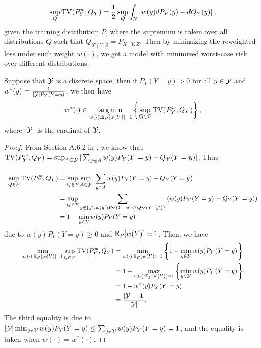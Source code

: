 \begin{equation}
	\small
	\sup_{Q}\mathrm{TV}(P^{w}_{Y}, Q_{Y}) = \frac{1}{2}\sup_{Q}\int_{\cY} \left|w(y)dP_{Y}(y) - dQ_{Y}(y)\right|,
\end{equation}
given the training distribution $P$, where the supremum is taken over all distributions $Q$ such that $Q_{X\mid Y,Z} = P_{X\mid Y,Z}$. Then by minimizing the reweighted loss under such weight $w(\cdot)$, we get a model with minimized worst-case risk over different distributions. 
\begin{proposition}
	Suppose that $\mathcal{Y}$ is a discrete space, then if $P_{Y}(Y = y) > 0$ for all $y\in \mathcal{Y}$ and $w^{*}(y) = \frac{1}{|\mathcal{Y}|P_{Y}(Y = y)}$, we then have
	\begin{equation}
		\small
		w^{*}(\cdot)\in\argmin_{w(\cdot):\mE_{P}[w(Y)] = 1}\left\{\sup_{Q\in\cP}\mathrm{TV}(P^{w}_{Y}, Q_{Y})\right\},
	\end{equation}
	where $|\mathcal{Y}|$ is the cardinal of $\mathcal{Y}$.
\end{proposition}
\begin{proof}
	From Section A.6.2 in \citep{van2000weak}, we know that $\mathrm{TV}(P^{w}_{Y}, Q_{Y}) = \sup_{A\subset\mathcal{Y}}|\sum_{y\in A}w(y)P_{Y}(Y = y) - Q_{Y}(Y = y)|$. Thus 
	\begin{equation}
		\small
		\begin{aligned}
			\sup_{Q\in\cP}\mathrm{TV}(P^{w}_{Y}, Q_{Y}) &= \sup_{Q\in\cP}\sup_{A\subset\cY}\left|\sum_{y\in A}w(y)P_{Y}(Y = y) - Q_{Y}(Y = y)\right| \\
			& = \sup_{Q\in\cP}\sum_{y\in\{y^{\prime}:w(y^{\prime})P_{Y}(Y = y^{\prime}) \geq Q_{Y}(Y = y^{\prime})\}}\left(w(y)P_{Y}(Y = y) - Q_{Y}(Y = y)\right) \\
			& = 1 - \min_{y\in\cY}w(y)P_{Y}(Y = y)
		\end{aligned}
	\end{equation}
	due to $w(y)P_{Y}(Y = y) \geq 0$ and $\mathbb{E}_{P}[w(Y)] = 1$. Then, we have
	\begin{equation}
		\small
		\begin{aligned}
			\min_{w(\cdot):\mE_{P}[w(Y)] = 1}\sup_{Q\in\cP}\mathrm{TV}(P^{w}_{Y}, Q_{Y}) &= \min_{w(\cdot):\mE_{P}[w(Y)] = 1}\left\{1 - \min_{y\in\cY}w(y)P_{Y}(Y = y)\right\} \\
			& = 1 - \max_{w(\cdot):\mE_{P}[w(Y)] = 1}\left\{\min_{y\in\cY}w(y)P_{Y}(Y = y)\right\} \\
			& = 1 - w^{*}(y)P_{Y}(Y=y) \\
			& = \frac{|\cY| - 1}{|\cY|}.
		\end{aligned}
	\end{equation}
	The third equality is due to $|\mathcal{Y}|\min_{y\in\mathcal{Y}}w(y)P_{Y}(Y = y)\leq \sum_{y\in\mathcal{Y}}w(y)P_{Y}(Y = y) = 1$, and the equality is taken when $w(\cdot) = w^{*}(\cdot)$. 
\end{proof}
